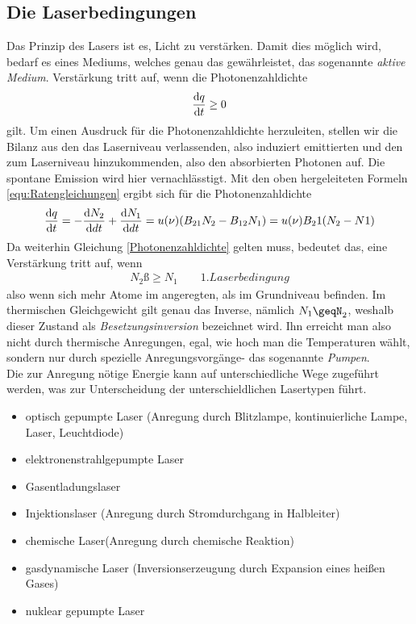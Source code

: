 \documentclass[a4paper,twoside,final]{article}
\begin{document}
\subsection{Die Laserbedingungen}
Das Prinzip des Lasers ist es, Licht zu verstärken. Damit dies möglich wird, bedarf es eines Mediums, welches genau das gewährleistet, das sogenannte \textit{aktive Medium}. Verstärkung tritt auf, wenn die Photonenzahldichte
\begin{align}
  \dv{q}{t} \geq 0
  \label{equ:Photonenzahldichte}
\end{align}
gilt. Um einen Ausdruck für die Photonenzahldichte herzuleiten, stellen wir die Bilanz aus den das Laserniveau verlassenden, also induziert emittierten und den zum Laserniveau hinzukommenden, also den absorbierten Photonen auf. Die spontane Emission wird hier vernachlässtigt. Mit den oben hergeleiteten Formeln \ref{equ:Ratengleichungen} ergibt sich für die Photonenzahldichte
\begin{align}
    \dv{q}{t}=-\dv{N_2}{dt}+\dv{N_1}{dt}=u(\nu)(B_{21}N_2-B_{12}N_1)=u(\nu)B_21(N_2-N1)
\end{align}
Da weiterhin Gleichung \ref{Photonenzahldichte} gelten muss, bedeutet das, eine Verstärkung tritt auf, wenn
\begin{align}
  N_2 ß\geq N_1 \qquad 1. Laserbedingung
\end{align}
also wenn sich mehr Atome im angeregten, als im Grundniveau befinden. Im thermischen Gleichgewicht gilt genau das Inverse, nämlich $N_1\geqN_2$, weshalb dieser Zustand als \textit{Besetzungsinversion} bezeichnet wird. Ihn erreicht man also nicht durch thermische Anregungen, egal, wie hoch man die Temperaturen wählt, sondern nur durch spezielle Anregungsvorgänge- das sogenannte \textit{Pumpen}.\\
Die zur Anregung nötige Energie kann auf unterschiedliche Wege zugeführt werden, was zur Unterscheidung der unterschieldlichen Lasertypen führt.
\begin{itemize}
  \item optisch gepumpte Laser (Anregung durch Blitzlampe, kontinuierliche Lampe, Laser, Leuchtdiode)
  \item elektronenstrahlgepumpte Laser
  \item Gasentladungslaser
  \item Injektionslaser (Anregung durch Stromdurchgang in Halbleiter)
  \item chemische Laser(Anregung durch chemische Reaktion)
  \item gasdynamische Laser (Inversionserzeugung durch Expansion eines heißen Gases)
  \item nuklear gepumpte Laser
\end{itemize}
\end{document}
